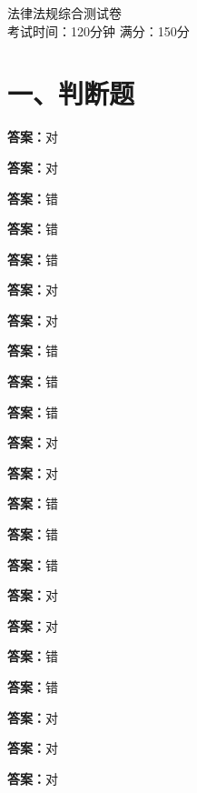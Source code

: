 \documentclass[12pt]{ctexart}
\begin{document}
\vspace*{-2em}
\begin{center}
  {\LARGE 法律法规综合测试卷}\\[4pt]
  考试时间：120分钟 \quad 满分：150分
\end{center}
\vspace{0.5em}

\section*{一、判断题}
\begin{questions}
\question {}\ifprintanswers\par\textbf{答案：}对\fi
\question {}\ifprintanswers\par\textbf{答案：}对\fi
\question {}\ifprintanswers\par\textbf{答案：}错\fi
\question {}\ifprintanswers\par\textbf{答案：}错\fi
\question {}\ifprintanswers\par\textbf{答案：}错\fi
\question {}\ifprintanswers\par\textbf{答案：}对\fi
\question {}\ifprintanswers\par\textbf{答案：}对\fi
\question {}\ifprintanswers\par\textbf{答案：}错\fi
\question {}\ifprintanswers\par\textbf{答案：}错\fi
\question {}\ifprintanswers\par\textbf{答案：}错\fi
\question {}\ifprintanswers\par\textbf{答案：}对\fi
\question {}\ifprintanswers\par\textbf{答案：}对\fi
\question {}\ifprintanswers\par\textbf{答案：}错\fi
\question {}\ifprintanswers\par\textbf{答案：}错\fi
\question {}\ifprintanswers\par\textbf{答案：}错\fi
\question {}\ifprintanswers\par\textbf{答案：}对\fi
\question {}\ifprintanswers\par\textbf{答案：}对\fi
\question {}\ifprintanswers\par\textbf{答案：}错\fi
\question {}\ifprintanswers\par\textbf{答案：}错\fi
\question {}\ifprintanswers\par\textbf{答案：}对\fi
\question {}\ifprintanswers\par\textbf{答案：}对\fi
\question {}\ifprintanswers\par\textbf{答案：}对\fi

\end{questions}
\end{document}
